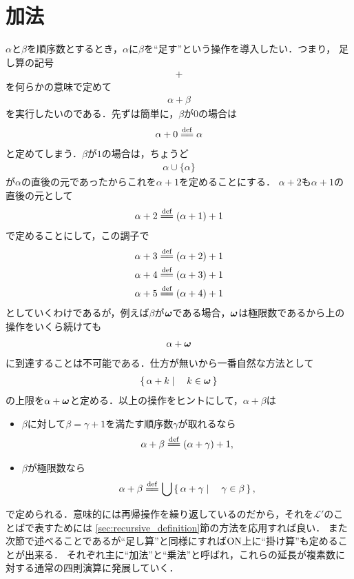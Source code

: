\section{加法}
	$\alpha$と$\beta$を順序数とするとき，$\alpha$に$\beta$を``足す''という操作を導入したい．つまり，
	足し算の記号
	\begin{align}
		+
	\end{align}
	を何らかの意味で定めて
	\begin{align}
		\alpha + \beta
	\end{align}
	を実行したいのである．先ずは簡単に，$\beta$が$0$の場合は
	\begin{align}
		\alpha + 0 \defeq \alpha
	\end{align}
	と定めてしまう．$\beta$が$1$の場合は，ちょうど
	\begin{align}
		\alpha \cup \{\alpha\}
	\end{align}
	が$\alpha$の直後の元であったからこれを$\alpha + 1$を定めることにする．
	$\alpha + 2$も$\alpha + 1$の直後の元として
	\begin{align}
		\alpha + 2 \defeq (\alpha + 1) + 1
	\end{align}
	で定めることにして，この調子で
	\begin{align}
		&\alpha + 3 \defeq (\alpha + 2) + 1 \\
		&\alpha + 4 \defeq (\alpha + 3) + 1 \\
		&\alpha + 5 \defeq (\alpha + 4) + 1
	\end{align}
	としていくわけであるが，例えば$\beta$が${\boldsymbol \omega}$である場合，${\boldsymbol \omega}$は極限数であるから上の操作をいくら続けても
	\begin{align}
		\alpha + {\boldsymbol \omega}
	\end{align}
	に到達することは不可能である．仕方が無いから一番自然な方法として
	\begin{align}
		\left\{\, \alpha + k \mid \quad k \in {\boldsymbol \omega}\, \right\}
	\end{align}
	の上限を$\alpha + {\boldsymbol \omega}$と定める．以上の操作をヒントにして，$\alpha + \beta$は
	\begin{itemize}
		\item $\beta$に対して$\beta = \gamma + 1$を満たす順序数$\gamma$が取れるなら
			\begin{align}
				\alpha + \beta \defeq (\alpha + \gamma) + 1,
			\end{align}
		
		\item $\beta$が極限数なら
			\begin{align}
				\alpha + \beta \defeq \bigcup \Set{\alpha + \gamma}{\gamma \in \beta},
			\end{align}
	\end{itemize}
	で定められる．意味的には再帰操作を繰り返しているのだから，それを$\mathcal{L}'$のことばで表すためには
	\ref{sec:recursive_definition}節の方法を応用すれば良い．
	また次節で述べることであるが``足し算''と同様にすれば$\mathrm{ON}$上に``掛け算''も定めることが出来る．
	それぞれ主に``加法''と``乗法''と呼ばれ，これらの延長が複素数に対する通常の四則演算に発展していく．
	
